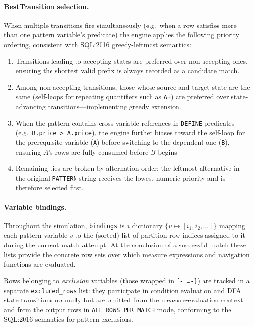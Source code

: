 \paragraph{BestTransition selection.}
When multiple transitions fire simultaneously (e.g.\ when a row
satisfies more than one pattern variable's predicate) the engine
applies the following priority ordering, consistent with
SQL:2016 greedy-leftmost semantics:
\begin{enumerate}
  \item Transitions leading to accepting states are preferred over
    non-accepting ones, ensuring the shortest valid prefix is
    always recorded as a candidate match.
  \item Among non-accepting transitions, those whose source and
    target state are the same (self-loops for repeating quantifiers
    such as \texttt{A+}) are preferred over state-advancing
    transitions—implementing greedy extension.
  \item When the pattern contains cross-variable references in
    \texttt{DEFINE} predicates (e.g.\ \texttt{B.price > A.price}),
    the engine further biases toward the self-loop for the
    prerequisite variable (\texttt{A}) before switching to the
    dependent one (\texttt{B}), ensuring $A$'s rows are fully
    consumed before $B$ begins.
  \item Remaining ties are broken by alternation order: the
    leftmost alternative in the original \texttt{PATTERN} string
    receives the lowest numeric priority and is therefore selected
    first.
\end{enumerate}

\paragraph{Variable bindings.}
Throughout the simulation, \texttt{bindings} is a dictionary
$\{ v \mapsto [i_1, i_2, \ldots] \}$ mapping each pattern
variable $v$ to the (sorted) list of partition row indices
assigned to it during the current match attempt.  At the
conclusion of a successful match these lists provide the concrete
row sets over which measure expressions and navigation functions
are evaluated.

Rows belonging to \emph{exclusion} variables (those wrapped in
\texttt{\{- \ldots -\}}) are tracked in a separate
\texttt{excluded\_rows} list: they participate in condition
evaluation and DFA state transitions normally but are omitted from
the measure-evaluation context and from the output rows in
\texttt{ALL ROWS PER MATCH} mode, conforming to the SQL:2016
semantics for pattern exclusions.

